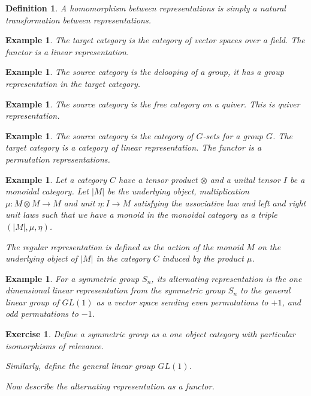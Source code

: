 \documentclass{tufte-book}
\newtheorem{definition}[theorem]{Definition}
\newtheorem{example}[theorem]{Example}
\newtheorem{exercise}[theorem]{Exercise}
\begin{document}
\begin{definition}
	A homomorphism between representations is simply a natural transformation between representations.
\end{definition}

\begin{example}
	The target category is the category of vector spaces over a field. The functor is a linear representation.
\end{example}

\begin{example}
	The source category is the delooping of a group, it has a group representation in the target category.
\end{example}

\begin{example}
	The source category is the free category on a quiver. This is quiver representation.
\end{example}

\begin{example}
	The source category is the category of $G$-sets for a group $G$. The target category is a category of linear representation. The functor is a permutation representations.	
\end{example}

\begin{example}
	Let a category $C$ have a tensor product $\otimes$ and a unital tensor $I$ be a monoidal category. Let $|M|$ be the underlying object, multiplication $\mu : M \otimes M \rightarrow M$ and unit $\eta : I \rightarrow M$  satisfying the associative law and left and right unit laws such that we have a monoid in the monoidal category as a triple $(|M|, \mu, \eta)$.

	The regular representation is defined as the action of the monoid $M$ on the underlying object of $|M|$ in the category $C$ induced by the product $\mu$.
\end{example}

\begin{example}
	For a symmetric group $S_n$, its alternating representation is the one dimensional linear representation from the symmetric group $S_n$ to the general linear group of $GL(1)$ as a vector space sending even permutations to $+1$, and odd permutations to $-1$.
\end{example}

\begin{exercise}
	Define a symmetric group as a one object category with particular isomorphisms of relevance.

	Similarly, define the general linear group $GL(1)$.

	Now describe the alternating representation as a functor.
\end{exercise}
\end{document}
